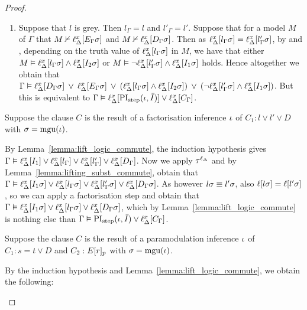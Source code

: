 \begin{proof}
\begin{indproof}
\begin{enumerate}
				\item Suppose that $l$ is grey.
					Then $l_\Gamma = l$ and $l'_\Gamma = l'$.
					Suppose that for a model $M$ of $\Gamma$ that $M \nvDash \ell_{\Delta}^{x}[E_\Gamma\sigma]$ and $M \nvDash \ell_{\Delta}^{x}[D_\Gamma\sigma]$.
					Then as $\ell_{\Delta}^{x}[l_\Gamma \sigma] = \ell_{\Delta}^{x}[l'_\Gamma\sigma]$, by \markA{} and \markB{}, depending on the truth value of $\ell_{\Delta}^{x}[l_\Gamma \sigma]$ in $M$, we have that either $M \vDash \ell_{\Delta}^{x}[l_\Gamma\sigma] \land \ell_{\Delta}^{x}[I_2\sigma]$ or $M \vDash \lnot\ell_{\Delta}^{x}[l'_\Gamma\sigma] \land \ell_{\Delta}^{x}[I_1\sigma]$ holds.
					Hence altogether we obtain that 
					$\Gamma \vDash
					\ell_{\Delta}^{x}[D_\Gamma\sigma] \;\,{\lor}\;\,
					\ell_{\Delta}^{x}[E_\Gamma\sigma] \;\,{\lor}\;\,\allowbreak
					(\ell_{\Delta}^{x}[l_\Gamma\sigma] \land \ell_{\Delta}^{x}[I_2\sigma]) \;\,{\lor}\;\,\allowbreak
					(\lnot\ell_{\Delta}^{x}[l'_\Gamma\sigma] \land \ell_{\Delta}^{x}[I_1\sigma])$.
					But this is equivalent to
					$\Gamma \vDash \ell_{\Delta}^{x}[\operatorname{PI}_{\mathrm{step}}(\iota, \bar I)] \lor \ell_{\Delta}^{x}[C_\Gamma]$.

			\end{enumerate}


			Suppose the clause $C$ is the result of a factorisation inference $\iota$ of $C_1: l \lor l' \lor D$ with $\sigma=\operatorname{mgu}(\iota)$.

			By Lemma~\ref{lemma:lift_logic_commute}, the induction hypothesis gives $\Gamma \vDash \ell_{\Delta}^{x}[ I_1 ] \lor \ell_{\Delta}^{x}[ l_\Gamma] \lor \ell_{\Delta}^{x}[l'_\Gamma] \lor \ell_{\Delta}^{x}[D_\Gamma ]$.
			Now we apply $\tau^{\ell_\Delta}$
			and by Lemma~\ref{lemma:lifting_subst_commute}, obtain that 
			$\Gamma \vDash \ell_{\Delta}^{x}[ I_1\sigma ] \lor \ell_{\Delta}^{x}[ l_\Gamma\sigma ] \lor  \ell_{\Delta}^{x}[l'_\Gamma\sigma] \lor \ell_{\Delta}^{x}[D_\Gamma\sigma ]$.
			As however $l\sigma \equiv l'\sigma$, 
			also $\ell[l\sigma] = \ell[l'\sigma]$, so we can apply a factorisation step and obtain that
			$\Gamma \vDash \ell_{\Delta}^{x}[ I_1\sigma ] \lor \ell_{\Delta}^{x}[ l_\Gamma\sigma] \lor \ell_{\Delta}^{x}[D_\Gamma\sigma ]$,
			which by Lemma~\ref{lemma:lift_logic_commute} is nothing else than $\Gamma \vDash \operatorname{PI}_{\mathrm{step}}(\iota, \bar I) \lor \ell_{\Delta}^{x}[C_\Gamma]$.

			Suppose the clause $C$ is the result of a paramodulation inference\nolinebreak{} $\iota$ of $C_1: s=t \lor D$ and $C_2: E{[r]_{p}}$ with $\sigma=\operatorname{mgu}(\iota)$.

			By the induction hypothesis and Lemma~\ref{lemma:lift_logic_commute}, we obtain the following: 


\end{indproof}
\end{proof}
